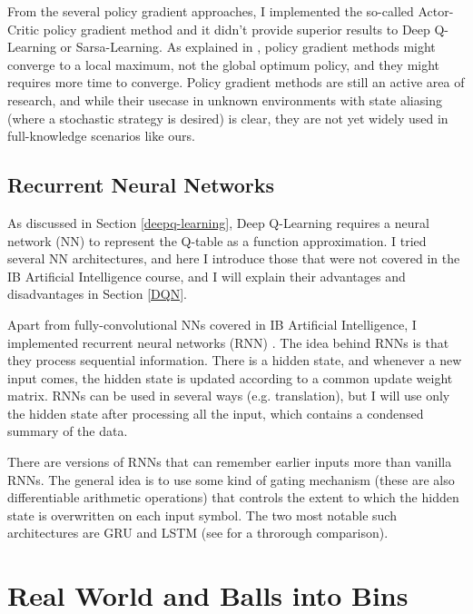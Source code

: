 From the several policy gradient approaches, I implemented the so-called Actor-Critic policy gradient method and it didn't provide superior results to Deep Q-Learning or Sarsa-Learning. As explained in \cite{bhandari2019policygradientconvergence}, policy gradient methods might converge to a local maximum, not the global optimum policy, and they might requires more time to converge. Policy gradient methods are still an active area of research, and while their usecase in unknown environments with state aliasing (where a stochastic strategy is desired) is clear, they are not yet widely used in full-knowledge scenarios like ours.


\subsection{Recurrent Neural Networks}


As discussed in Section \ref{deepq-learning}, Deep Q-Learning requires a neural network (NN) to represent the Q-table as a function approximation. I tried several NN architectures, and here I introduce those that were not covered in the IB Artificial Intelligence course, and I will explain their advantages and disadvantages in Section \ref{DQN}. 

Apart from fully-convolutional NNs covered in IB Artificial Intelligence, I implemented recurrent neural networks (RNN) \cite{hopfield1982RNNoriginal}. The idea behind RNNs is that they process sequential information. There is a hidden state, and whenever a new input comes, the hidden state is updated according to a common update weight matrix. RNNs can be used in several ways (e.g. translation), but I will use only the hidden state after processing all the input, which contains a condensed summary of the data.



There are versions of RNNs that can remember earlier inputs more than vanilla RNNs. The general idea is to use some kind of gating mechanism (these are also differentiable arithmetic operations) that controls the extent to which the hidden state is overwritten on each input symbol. The two most notable such architectures are GRU and LSTM (see \cite{shewalkar2019rnngrulstm} for a throrough comparison).


\section{Real World and Balls into Bins} \label{alternative}

